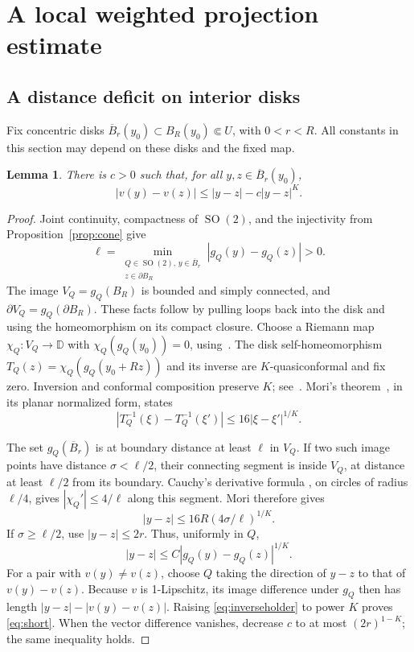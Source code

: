 \documentclass[11pt]{article}
\newtheorem{lemma}{Lemma}[section]
\theoremstyle{remark}
\numberwithin{equation}{section}
\newcommand{\D}{\mathbb D}
\newcommand{\SO}{\operatorname{SO}}
\begin{document}
\section{A local weighted projection estimate}\label{sec:projection}

\subsection{A distance deficit on interior disks}

Fix concentric disks
\(\overline B_r(y_0)\subset B_R(y_0)\Subset U\), with \(0<r<R\).
All constants in this section may depend on these disks and the fixed map.

\begin{lemma}\label{lem:short}
There is \(c>0\) such that, for all \(y,z\in\overline B_r(y_0)\),
\begin{equation}\label{eq:short}
|v(y)-v(z)|\le |y-z|-c|y-z|^K.
\end{equation}
\end{lemma}

\begin{proof}
Joint continuity, compactness of \(\SO(2)\), and the injectivity from
Proposition~\ref{prop:cone} give
\[
\ell=\min_{\substack{Q\in\SO(2),\,y\in\overline B_r\\z\in\partial B_R}}
|g_Q(y)-g_Q(z)|>0.
\]
The image \(V_Q=g_Q(B_R)\) is bounded and simply connected, and
\(\partial V_Q=g_Q(\partial B_R)\). These facts follow by pulling loops
back into the disk and using the homeomorphism on its compact closure.
Choose a Riemann map \(\chi_Q:V_Q\to\D\) with
\(\chi_Q(g_Q(y_0))=0\), using~\cite[p.~1]{SiuR}.
The disk self-homeomorphism
\(T_Q(z)=\chi_Q(g_Q(y_0+Rz))\) and its inverse are
\(K\)-quasiconformal and fix zero. Inversion and conformal composition
preserve \(K\); see~\cite[Theorem~4.16 and the following paragraph]{Calegari}.
Mori's theorem~\cite[Theorem~1.1]{Mori}, in its planar normalized form,
states
\[
|T_Q^{-1}(\xi)-T_Q^{-1}(\xi')|
\le16|\xi-\xi'|^{1/K}.
\]

The set \(g_Q(\overline B_r)\) is at boundary distance at least \(\ell\)
in \(V_Q\). If two such image points have distance \(\sigma<\ell/2\),
their connecting segment is inside \(V_Q\), at distance at least
\(\ell/2\) from its boundary. Cauchy's derivative formula
\cite[p.~5]{SiuC}, on circles of radius \(\ell/4\), gives
\(|\chi_Q'|\le4/\ell\) along this segment. Mori therefore gives
\[
|y-z|\le16R(4\sigma/\ell)^{1/K}.
\]
If \(\sigma\ge\ell/2\), use \(|y-z|\le2r\).
Thus, uniformly in \(Q\),
\begin{equation}\label{eq:inverseholder}
|y-z|\le C|g_Q(y)-g_Q(z)|^{1/K}.
\end{equation}
For a pair with \(v(y)\ne v(z)\), choose \(Q\) taking the direction of
\(y-z\) to that of \(v(y)-v(z)\).
Because \(v\) is 1-Lipschitz, its image difference under \(g_Q\) then has
length \(|y-z|-|v(y)-v(z)|\). Raising \eqref{eq:inverseholder} to
power \(K\) proves \eqref{eq:short}.
When the vector difference vanishes, decrease \(c\) to at most
\((2r)^{1-K}\); the same inequality holds.
\end{proof}
\end{document}
